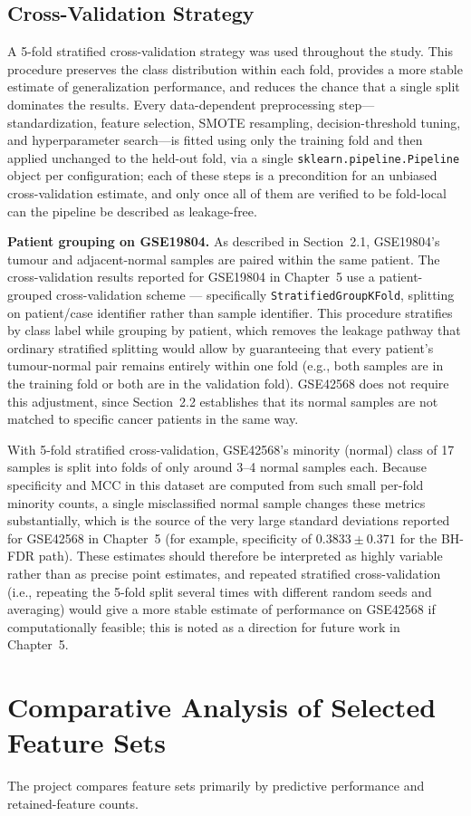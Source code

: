 \subsection{Cross-Validation Strategy}
\label{sec:cv}

A 5-fold stratified cross-validation strategy was used throughout the study. This procedure preserves the class distribution within each fold, provides a more stable estimate of generalization performance, and reduces the chance that a single split dominates the results. Every data-dependent preprocessing step---standardization, feature selection, SMOTE resampling, decision-threshold tuning, and hyperparameter search---is fitted using only the training fold and then applied unchanged to the held-out fold, via a single \texttt{sklearn.pipeline.Pipeline} object per configuration; each of these steps is a precondition for an unbiased cross-validation estimate, and only once all of them are verified to be fold-local can the pipeline be described as leakage-free.

\textbf{Patient grouping on GSE19804.} As described in Section~2.1, GSE19804's tumour and adjacent-normal samples are paired within the same patient. The cross-validation results reported for GSE19804 in Chapter~5 use a patient-grouped cross-validation scheme --- specifically \texttt{StratifiedGroupKFold}, splitting on patient/case identifier rather than sample identifier. This procedure stratifies by class label while grouping by patient, which removes the leakage pathway that ordinary stratified splitting would allow by guaranteeing that every patient's tumour-normal pair remains entirely within one fold (e.g., both samples are in the training fold or both are in the validation fold). GSE42568 does not require this adjustment, since Section~2.2 establishes that its normal samples are not matched to specific cancer patients in the same way.

With 5-fold stratified cross-validation, GSE42568's minority (normal) class of 17 samples is split into folds of only around 3--4 normal samples each. Because specificity and MCC in this dataset are computed from such small per-fold minority counts, a single misclassified normal sample changes these metrics substantially, which is the source of the very large standard deviations reported for GSE42568 in Chapter~5 (for example, specificity of $0.3833 \pm 0.371$ for the BH-FDR path). These estimates should therefore be interpreted as highly variable rather than as precise point estimates, and repeated stratified cross-validation (i.e., repeating the 5-fold split several times with different random seeds and averaging) would give a more stable estimate of performance on GSE42568 if computationally feasible; this is noted as a direction for future work in Chapter~5.

\section{Comparative Analysis of Selected Feature Sets}

The project compares feature sets primarily by predictive performance and retained-feature counts.